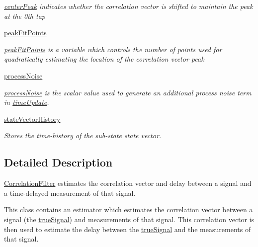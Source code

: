 \begin{DoxyCompactItemize}
\begin{DoxyCompactList}\small\item\em \hyperlink{classSignalCorrelationSubstate_1_1CorrelationFilter_a8e53182c2ff431a6a545a265cda6ba48}{center\+Peak} indicates whether the correlation vector is shifted to maintain the peak at the 0th tap \end{DoxyCompactList}\item 
\hyperlink{classSignalCorrelationSubstate_1_1CorrelationFilter_a85a73739e9bb0a7f20886a812a3afa83}{peak\+Fit\+Points}
\begin{DoxyCompactList}\small\item\em \hyperlink{classSignalCorrelationSubstate_1_1CorrelationFilter_a85a73739e9bb0a7f20886a812a3afa83}{peak\+Fit\+Points} is a variable which controls the number of points used for quadratically estimating the location of the correlation vector peak \end{DoxyCompactList}\item 
\hyperlink{classSignalCorrelationSubstate_1_1CorrelationFilter_abbd9598dd2d237abb1eef86ba427da7f}{process\+Noise}
\begin{DoxyCompactList}\small\item\em \hyperlink{classSignalCorrelationSubstate_1_1CorrelationFilter_abbd9598dd2d237abb1eef86ba427da7f}{process\+Noise} is the scalar value used to generate an additional process noise term in \hyperlink{classSignalCorrelationSubstate_1_1CorrelationFilter_a07a8c37a30c3d0a057049e0ff2eac67f}{time\+Update}. \end{DoxyCompactList}\item 
\hyperlink{classSubStates_1_1SubState_a24bf2de56fc3037d91cba43d28f3bf60}{state\+Vector\+History}
\begin{DoxyCompactList}\small\item\em Stores the time-\/history of the sub-\/state state vector. \end{DoxyCompactList}\end{DoxyCompactItemize}


\subsection{Detailed Description}
\hyperlink{classSignalCorrelationSubstate_1_1CorrelationFilter}{Correlation\+Filter} estimates the correlation vector and delay between a signal and a time-\/delayed measurement of that signal. 

This class contains an estimator which estimates the correlation vector between a signal (the \hyperlink{classSignalCorrelationSubstate_1_1CorrelationFilter_a67ff75effd8a8a7e34f0f3e8c56ef491}{true\+Signal}) and measurements of that signal. This correlation vector is then used to estimate the delay between the \hyperlink{classSignalCorrelationSubstate_1_1CorrelationFilter_a67ff75effd8a8a7e34f0f3e8c56ef491}{true\+Signal} and the measurements of that signal.

